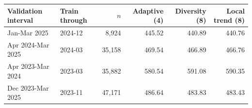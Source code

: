 \begin{tabular}{llrrrr}
\toprule
Validation interval & Train through & $n$ & Adaptive (4) & Diversity (8) & Local trend (8) \\
\midrule
Jan-Mar 2025 & 2024-12 & 8,924 & 445.52 & 440.89 & 440.76 \\
Apr 2024-Mar 2025 & 2024-03 & 35,158 & 469.54 & 466.89 & 466.76 \\
Apr 2023-Mar 2024 & 2023-03 & 35,882 & 580.54 & 591.08 & 590.35 \\
Dec 2023-Mar 2025 & 2023-11 & 47,171 & 486.64 & 483.83 & 483.43 \\
\bottomrule
\end{tabular}

